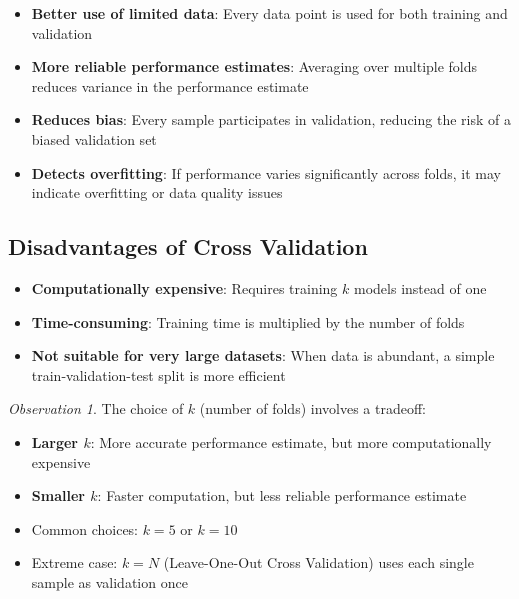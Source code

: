 \documentclass[11pt,a4paper]{article}
\theoremstyle{definition}
\theoremstyle{plain}
\theoremstyle{remark}
\newtheorem*{observation}{Observation}
\begin{document}
\begin{itemize}
    \item \textbf{Better use of limited data}: Every data point is used for both training and validation
    
    \item \textbf{More reliable performance estimates}: Averaging over multiple folds reduces variance in the performance estimate
    
    \item \textbf{Reduces bias}: Every sample participates in validation, reducing the risk of a biased validation set
    
    \item \textbf{Detects overfitting}: If performance varies significantly across folds, it may indicate overfitting or data quality issues
\end{itemize}

\subsection{Disadvantages of Cross Validation}

\begin{itemize}
    \item \textbf{Computationally expensive}: Requires training $k$ models instead of one
    
    \item \textbf{Time-consuming}: Training time is multiplied by the number of folds
    
    \item \textbf{Not suitable for very large datasets}: When data is abundant, a simple train-validation-test split is more efficient
\end{itemize}

\begin{observation}
The choice of $k$ (number of folds) involves a tradeoff:
\begin{itemize}
    \item \textbf{Larger $k$}: More accurate performance estimate, but more computationally expensive
    \item \textbf{Smaller $k$}: Faster computation, but less reliable performance estimate
    \item Common choices: $k = 5$ or $k = 10$
    \item Extreme case: $k = N$ (Leave-One-Out Cross Validation) uses each single sample as validation once
\end{itemize}
\end{observation}
\end{document}

